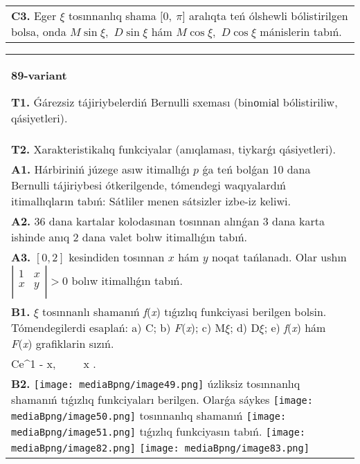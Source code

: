 \documentclass{article}
\begin{document}
\begin{tabular}{m{17cm}}
 \\
\textbf{C3.} Eger \(\xi\) tosınnanlıq shama \(\lbrack 0,\ \pi\rbrack\) aralıqta teń ólshewli bólistirilgen bolsa, onda \(M\sin\xi,\) \(D\sin\xi\) hám \(M\cos\xi,\) \(D\cos\xi\) mánislerin tabıń.
 \\

\end{tabular}
\vspace{1cm}


\begin{tabular}{m{17cm}}
\textbf{89-variant}
\newline

\textbf{T1.} Ǵárezsiz tájiriybelerdiń Bernulli sxeması (binоmiаl bólistiriliw, qásiyetleri).
 \\
\textbf{T2.} Xarakteristikalıq funkciyalar (anıqlaması, tiykarǵı qásiyetleri).
 \\
\textbf{A1.} Hárbiriniń júzege asıw itimallıǵı $p$ ǵa teń bolǵan 10 dana Bernulli tájiriybesi ótkerilgende, tómendegi waqıyalardıń itimallıqların tabıń: Sátliler menen sátsizler izbe-iz keliwi.
 \\
\textbf{A2.} 36 dana kartalar kolodasınan tosınnan alınǵan 3 dana karta ishinde anıq 2 dana valet bolıw itimallıǵın tabıń.
 \\
\textbf{A3.} $\left[ 0,2 \right]$ kesindiden tosınnan $x$ hám $y$ noqat tańlanadı. Olar ushın $\left| \begin{matrix}
   1 & x  \\
   x & y  \\
\end{matrix} \right|>0$ bolıw itimallıǵın tabıń.
 \\
\textbf{B1.} $\xi$ tosınnanlı shamanıń \emph{f}(\emph{x}) tıǵızlıq funkciyasi berilgen bolsin. Tómendegilerdi esaplań: a) C; b) \emph{F}(\emph{x}); c) M$\xi$; d) D$\xi$; e) \emph{f}(\emph{x}) hám \emph{F}(\emph{x}) grafiklarin sızıń.\(f(x) = \left\{ \begin{matrix}
\ \ \ \ \ \ \ \ 0,\ \ \ \ \ \ x < 1, \\
Ce^{1 - x},\ \ \ \ \ x \geq 1.\ \ 
\end{matrix} \right.\ \)
 \\
\textbf{B2.} \texttt{[image: mediaBpng/image49.png]} úzliksiz tosınnanlıq shamanıń tıǵızlıq funkciyaları berilgen. Olarǵa sáykes \texttt{[image: mediaBpng/image50.png]} tosınnanlıq shamanıń \texttt{[image: mediaBpng/image51.png]} tıǵızlıq funkciyasın tabıń. \texttt{[image: mediaBpng/image82.png]} \texttt{[image: mediaBpng/image83.png]}

\end{tabular}
\end{document}
